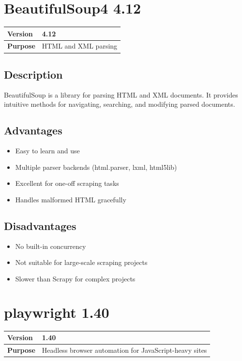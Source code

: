 \documentclass[12pt,a4paper]{report}
\begin{document}
\section{BeautifulSoup4 4.12}

\begin{tabular}{|p{4cm}|p{10cm}|}
\hline
\textbf{Version} & 4.12 \\
\hline
\textbf{Purpose} & HTML and XML parsing \\
\hline
\end{tabular}

\subsection{Description}

BeautifulSoup is a library for parsing HTML and XML documents. It provides intuitive methods for navigating, searching, and modifying parsed documents.

\subsection{Advantages}

\begin{itemize}
    \item Easy to learn and use
    \item Multiple parser backends (html.parser, lxml, html5lib)
    \item Excellent for one-off scraping tasks
    \item Handles malformed HTML gracefully
\end{itemize}

\subsection{Disadvantages}

\begin{itemize}
    \item No built-in concurrency
    \item Not suitable for large-scale scraping projects
    \item Slower than Scrapy for complex projects
\end{itemize}

\section{playwright 1.40}

\begin{tabular}{|p{4cm}|p{10cm}|}
\hline
\textbf{Version} & 1.40 \\
\hline
\textbf{Purpose} & Headless browser automation for JavaScript-heavy sites \\
\hline
\end{tabular}
\end{document}
